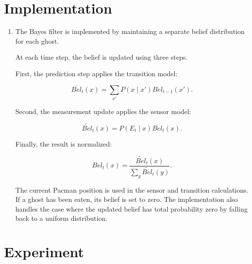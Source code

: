 \documentclass{article}
\begin{document}

\section{Implementation}

\begin{enumerate}[label=\alph*.,leftmargin=*]

    \item
    The Bayes filter is implemented by maintaining a separate belief
    distribution for each ghost.

    At each time step, the belief is updated using three steps.

    First, the prediction step applies the transition model:

    \[
    \overline{Bel}_t(x)
    =
    \sum_{x'}
    P(x\mid x')Bel_{t-1}(x').
    \]

    Second, the measurement update applies the sensor model:

    \[
    \widetilde{Bel}_t(x)
    =
    P(E_t\mid x)\overline{Bel}_t(x).
    \]

    Finally, the result is normalized:

    \[
    Bel_t(x)
    =
    \frac{
    \widetilde{Bel}_t(x)
    }{
    \sum_y \widetilde{Bel}_t(y)
    }.
    \]

    The current Pacman position is used in the sensor and transition
    calculations. If a ghost has been eaten, its belief is set to zero.
    The implementation also handles the case where the updated belief has
    total probability zero by falling back to a uniform distribution.

\end{enumerate}


\section{Experiment}
\end{document}
